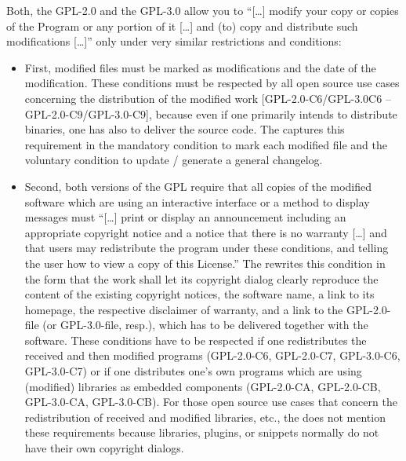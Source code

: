 Both, the GPL-2.0 and the GPL-3.0 allow you to \enquote{[\ldots] modify your
copy or copies of the Program or any portion of it [\ldots] and (to) copy and
distribute such modifications [\ldots]} only under very similar restrictions and
conditions: 
\begin{itemize}
\item First, modified files must be marked as modifications and the date of the
  modification. These conditions must be respected by all
  open source use cases concerning the distribution of the modified work
  [GPL-2.0-C6/GPL-3.0C6 -- GPL-2.0-C9/GPL-3.0-C9], because even if one primarily
  intends to distribute binaries, one has also to deliver the source code. The
  \oslic{} captures this requirement in the mandatory condition to mark each
  modified file and the voluntary condition to update / generate a general
  changelog.
    
\item Second, both versions of the GPL require that all copies of the modified
  software which are using an interactive interface or a method to display
  messages must \enquote{[\ldots] print or display an announcement including an
  appropriate copyright notice and a notice that there is no warranty [\ldots]
  and that users may redistribute the program under these conditions, and
  telling the user how to view a copy of this License.}
  The \oslic{} rewrites this condition in the form that the work shall let its
  copyright dialog clearly reproduce the content of the existing copyright
  notices, the software name, a link to its homepage, the respective disclaimer
  of warranty, and a link to the GPL-2.0-file (or GPL-3.0-file, resp.), which
  has to be delivered together with the software.
  These conditions have to be respected if one redistributes the received and
  then modified programs (GPL-2.0-C6, GPL-2.0-C7, GPL-3.0-C6, GPL-3.0-C7) or if
  one distributes one's own programs which are using (modified) libraries as
  embedded components (GPL-2.0-CA, GPL-2.0-CB, GPL-3.0-CA, GPL-3.0-CB). For
  those open source use cases that concern the redistribution of received and
  modified libraries, etc., the \oslic{} does not mention these requirements
  because libraries, plugins, or snippets normally do not have their own
  copyright dialogs.  
    

\end{itemize}
